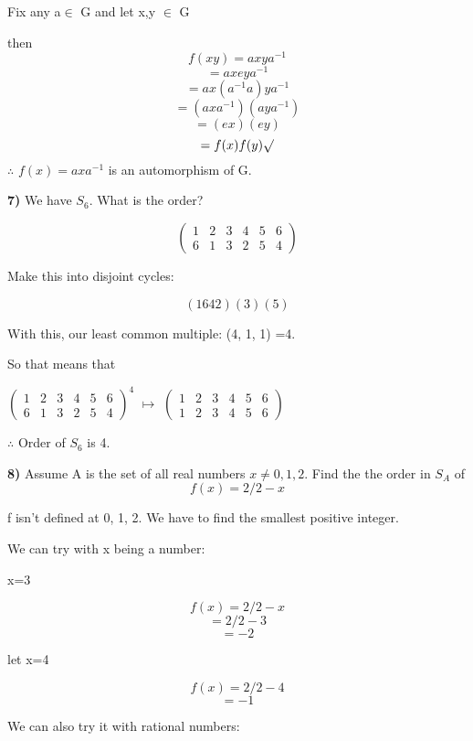 \documentclass{article}
\begin{document}
\medskip

Fix any a$\in$ G and let x,y $\in$ G

then $$f(xy)=axya^{-1}$$
$$=axeya^{-1} $$
$$=ax(a^{-1}a)ya^{-1}$$
$$=(axa^{-1})(aya^{-1})$$
$$=(ex)(ey)$$
$$=f(x)f(y)\surd$$
\medskip
$\therefore$ $f(x)=axa^{-1}$ is an automorphism of G.


\newpage

\textbf{7)}  We have $S_6$. What is the order?

$$(\begin{smallmatrix}
1 &2 &3 &4 &5 &6 \\
6 & 1 &3 &2 &5 &4 
\end{smallmatrix})$$

Make this into disjoint cycles:

$$(1642)(3)(5) $$

With this, our least common multiple: (4, 1, 1) =4.

\medskip

So that means that 

\medskip
\begin{center}
$(\begin{smallmatrix}					 
1 &2 &3 &4 &5 &6 \\
6 & 1 &3 &2 &5 &4 
\end{smallmatrix})^{4}$     $\mapsto$ $(\begin{smallmatrix}
					1 &2 &3 &4 &5 &6 \\
					1 &2 &3 &4 &5 &6 
					\end{smallmatrix})$
\end{center}
					
					\medskip
					
$\therefore$ Order of $S_6$ is 4.

\newpage

\textbf{8)} 	Assume A is the set of all real numbers $x \neq 0, 1, 2$.  
Find the the order in $S_A$ of 
$$f(x)=2/2-x$$


f isn't defined at 0, 1, 2.  We have to find the smallest positive integer. 



We can try with x being a number:
\medskip

x=3

$$f(x)=2/2-x$$
$$=2/2-3$$
$$=-2$$

let x=4

$$f(x)=2/2-4$$
$$=-1$$

We can also try it with rational numbers:
\end{document}
